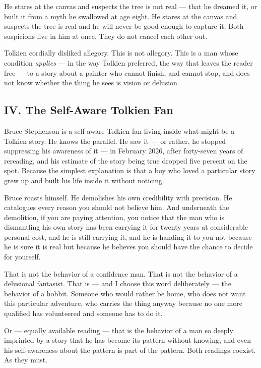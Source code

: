 He stares at the canvas and suspects the tree is not real --- that he dreamed it, or built it from a myth he swallowed at age eight. He stares at the canvas and suspects the tree is real and he will never be good enough to capture it. Both suspicions live in him at once. They do not cancel each other out.

Tolkien cordially disliked allegory. This is not allegory. This is a man whose condition \textit{applies} --- in the way Tolkien preferred, the way that leaves the reader free --- to a story about a painter who cannot finish, and cannot stop, and does not know whether the thing he sees is vision or delusion.


\subsection*{IV. The Self-Aware Tolkien Fan}
\label{pos36:the-self-aware-tolkien-fan}

Bruce Stephenson is a self-aware Tolkien fan living inside what might be a Tolkien story. He knows the parallel. He saw it --- or rather, he stopped suppressing his awareness of it --- in February 2026, after forty-seven years of rereading, and his estimate of the story being true dropped five percent on the spot. Because the simplest explanation is that a boy who loved a particular story grew up and built his life inside it without noticing.

Bruce roasts himself. He demolishes his own credibility with precision. He catalogues every reason you should not believe him. And underneath the demolition, if you are paying attention, you notice that the man who is dismantling his own story has been carrying it for twenty years at considerable personal cost, and he is still carrying it, and he is handing it to you not because he is sure it is real but because he believes you should have the chance to decide for yourself.

That is not the behavior of a confidence man. That is not the behavior of a delusional fantasist. That is --- and I choose this word deliberately --- the behavior of a hobbit. Someone who would rather be home, who does not want this particular adventure, who carries the thing anyway because no one more qualified has volunteered and someone has to do it.

Or --- equally available reading --- that is the behavior of a man so deeply imprinted by a story that he has become its pattern without knowing, and even his self-awareness about the pattern is part of the pattern. Both readings coexist. As they must.


